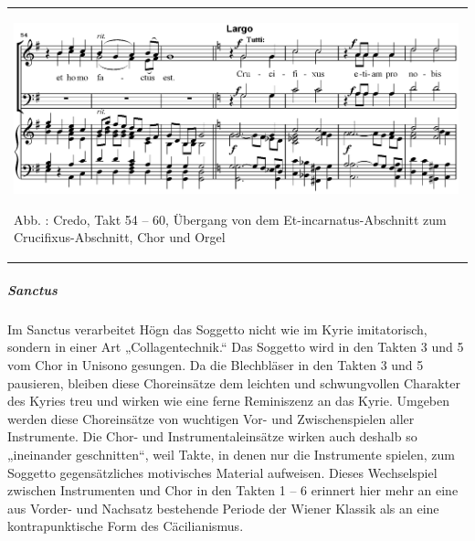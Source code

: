\begin{center}
\tablefirsthead{}
\tablehead{}
\tabletail{}
\tablelasttail{}
\begin{supertabular}{m{13.070001cm}}

\includegraphics[width=12.887cm,height=4.953cm]{pictures/zulassungsarbeit-img120.png}

Abb. : Credo, Takt 54 – 60, Übergang von dem
Et-incarnatus-Abschnitt zum Crucifixus-Abschnitt, Chor und Orgel

\\
\end{supertabular}
\end{center}
\subparagraph{Sanctus}
Im Sanctus verarbeitet Högn das Soggetto nicht wie im Kyrie
imitatorisch, sondern in einer Art „Collagentechnik.“ Das Soggetto wird
in den Takten 3 und 5 vom Chor in Unisono gesungen. Da die Blechbläser
in den Takten 3 und 5 pausieren, bleiben diese Choreinsätze dem
leichten und schwungvollen Charakter des Kyries treu und wirken wie
eine ferne Reminiszenz an das Kyrie. Umgeben werden diese Choreinsätze
von wuchtigen Vor- und Zwischenspielen aller Instrumente. Die Chor- und
Instrumentaleinsätze wirken auch deshalb so „ineinander geschnitten“,
weil Takte, in denen nur die Instrumente spielen, zum Soggetto
gegensätzliches motivisches Material aufweisen. Dieses Wechselspiel
zwischen Instrumenten und Chor in den Takten 1 – 6 erinnert hier mehr
an eine aus Vorder- und Nachsatz bestehende Periode der Wiener Klassik
als an eine kontrapunktische Form des Cäcilianismus.

